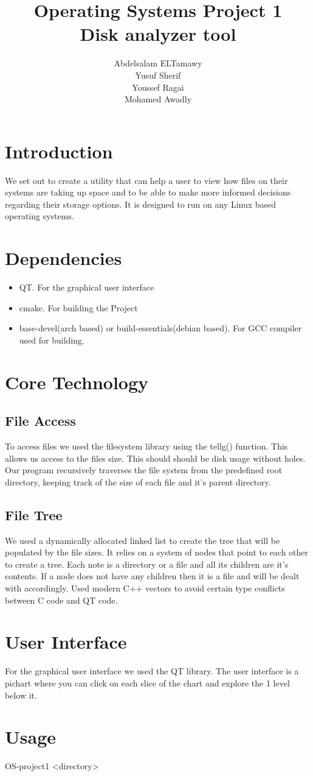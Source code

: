 \documentclass[]{article}
\author{Abdelsalam ELTamawy\\Yusuf Sherif\\Youssef Ragai\\Mohamed Awadly}
\title{Operating Systems Project 1\\Disk analyzer tool}
\begin{document}
    \begin{titlepage}

        \maketitle
    \end{titlepage}

    \section{Introduction}
    We set out to create a utility that can help a user to view how files on their systems are taking up space and to be able to make more informed decisions regarding their storage options.
    It is designed to run on any Linux based operating systems.

    \section{Dependencies}
    \begin{itemize}
        \item QT. For the graphical user interface
        \item cmake. For building the Project
        \item base-devel(arch based) or build-essentials(debian based). For GCC compiler used for building.
    \end{itemize}

    \section{Core Technology}
    \subsection{File Access}
    To access files we used the filesystem library using the tellg() function.
    This allows us access to the files size. This should should be disk usage without holes. Our program recursively traverses the file system from the predefined root directory, keeping track of the size of each file and it's parent directory.

    \subsection{File Tree}
    We used a dynamically allocated linked list to create the tree that will be populated by the file sizes. It relies on a system of nodes that point to each other to create a tree. Each note is a directory or a file and all its children are it's contents.
    If a node does not have any children then it is a file and will be dealt with accordingly. Used modern C++ vectors to avoid certain type conflicts between C code and QT code.

    \section{User Interface}
    For the graphical user interface we used the QT library. The user interface is a pichart where you can click on each slice of the chart and explore the 1 level below it.

    \section{Usage}
    OS-project1 <directory>
\end{document}
